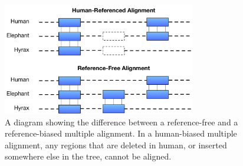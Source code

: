 \documentclass[fleqn,10pt]{wlscirep}
\begin{document}
\begin{figure}
\begin{center}
\includegraphics[width=0.75\textwidth]{reference-free-diagram}
\caption{A diagram showing the difference between a reference-free and a reference-biased multiple alignment. In a human-biased multiple alignment, any regions that are deleted in human, or inserted somewhere else in the tree, cannot be aligned.}\label{fig:referencefree}
\end{center}
\end{figure}
\end{document}
